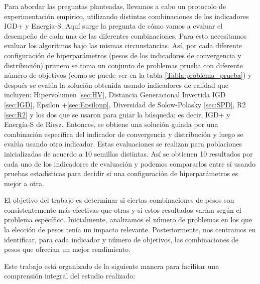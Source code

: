 Para abordar las preguntas planteadas, llevamos a cabo un protocolo de experimentación empírico, utilizando distintas combinaciones de los indicadores IGD+ y Energía-S. Aquí surge la pregunta de cómo vamos a evaluar el desempeño de cada una de las diferentes combinaciones. Para esto necesitamos evaluar los algoritmos bajo las mismas circunstancias. Así, por cada diferente configuración de hiperparámetros (pesos de los indicadores de convergencia y distribución) primero se toma un conjunto de problemas prueba con diferente número de objetivos (como se puede ver en la tabla \ref{Tabla:problema_prueba}) y después se evalúa la solución obtenida usando indicadores de calidad que incluyen: Hipervolumen \ref{sec:HV}, Distancia Generacional Invertida IGD \ref{sec:IGD}, Epsilon +\ref{sec:Epsilonp}, Diversidad de Solow-Polasky \ref{sec:SPD}, R2 \ref{sec:R2} y los dos que se usaron para guiar la búsqueda; es decir, IGD+ y Energía-S de Riesz. Entonces, se obtiene una solución guiada por una combinación específica del indicador de convergencia y distribución y luego se evalúa usando otro indicador. Estas evaluaciones se realizan para poblaciones inicializadas de acuerdo a 10 semillas distintas. Así se obtienen 10 resultados por cada uno de los indicadores de evaluación y podemos compararlos entre sí usando pruebas estadísticas para decidir si una configuración de hiperparámetros es mejor a otra.

El objetivo del trabajo es determinar si ciertas combinaciones de pesos son consistentemente más efectivas que otras y si estos resultados varían según el problema específico. Inicialmente, analizamos el número de problemas en los que la elección de pesos tenía un impacto relevante. Posteriormente, nos centramos en identificar, para cada indicador y número de objetivos, las combinaciones de pesos que ofrecían un mejor rendimiento.

Este trabajo está organizado de la siguiente manera para facilitar una comprensión integral del estudio realizado:

